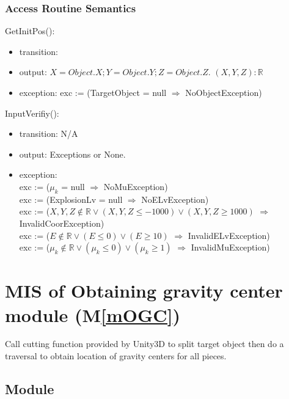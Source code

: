 \documentclass[12pt, titlepage]{article}
\newcommand{\mref}[1]{M\ref{#1}}
\begin{document}
\subsubsection{Access Routine Semantics}

\noindent GetInitPos():
\begin{itemize}
	\item transition: 
	\item output: $X = Object.X; Y = Object.Y; Z = Object.Z$. $(X,Y,Z):\mathbb{R}$ 
	\item exception: exc := (TargetObject = null $\Rightarrow $ NoObjectException)
\end{itemize}

\noindent InputVerifiy():
\begin{itemize}
\item transition: N/A
\item output: Exceptions or None.
\item exception:\\
exc := ($\mu_{k}$ = null $\Rightarrow $ NoMuException)\\
exc := (ExplosionLv = null $\Rightarrow $ NoELvException)\\
exc := ($X,Y,Z \notin \mathbb{R} \vee (X,Y,Z \le -1000) \vee (X,Y,Z \ge 1000)$ $\Rightarrow $ InvalidCoorException)\\
exc := ($E \notin \mathbb{R} \vee (E \leq 0) \vee (E \geq 10)$ $\Rightarrow $ InvalidELvException)\\
exc := ($\mu_{k} \notin \mathbb{R} \vee (\mu_{k} \le 0) \vee (\mu_{k} \ge 1)$ $\Rightarrow $ InvalidMuException)\\
\end{itemize}

\section{MIS of Obtaining gravity center module (\mref{mOGC})} 

Call cutting function provided by Unity3D to split target object then do a traversal to obtain location of gravity centers for all pieces. 

\subsection{Module}
\end{document}
